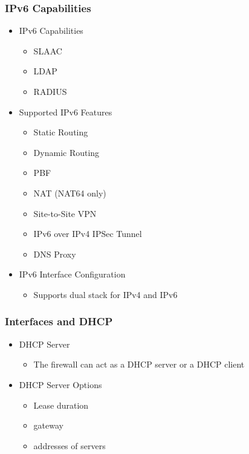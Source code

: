 \subsubsection{IPv6 Capabilities}
    \begin{itemize}
        \item IPv6 Capabilities
            \begin{itemize}
                \item SLAAC
                \item LDAP
                \item RADIUS
            \end{itemize}
        \item Supported IPv6 Features
            \begin{itemize}
                \item Static Routing
                \item Dynamic Routing
                \item PBF
                \item NAT (NAT64 only)
                \item Site-to-Site VPN
                \item IPv6 over IPv4 IPSec Tunnel
                \item DNS Proxy
            \end{itemize}
        \item IPv6 Interface Configuration
            \begin{itemize}
                \item Supports dual stack for IPv4 and IPv6
            \end{itemize}
    \end{itemize}

\subsubsection{Interfaces and DHCP}
    \begin{itemize}
        \item DHCP Server
            \begin{itemize}
                \item The firewall can act as a DHCP server or a DHCP client
            \end{itemize}
        \item DHCP Server Options
            \begin{itemize}
                \item Lease duration
                \item gateway
                \item addresses of servers
            \end{itemize}
    \end{itemize}

